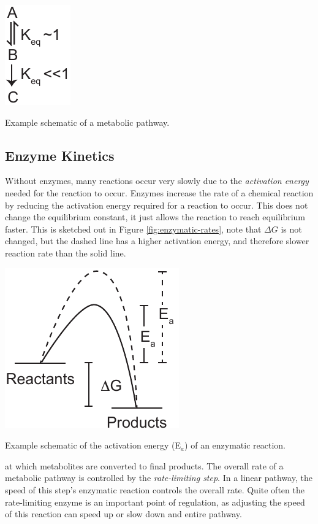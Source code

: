 \documentclass{tufte-handout}
\begin{document}
\begin{marginfigure}
\includegraphics[width=0.5\marginparwidth]{figures/committed-step.pdf}\
\caption{Example schematic of a metabolic pathway.}
\label{fig:committed-step}
\end{marginfigure}

\subsection{Enzyme Kinetics}

Without enzymes, many reactions occur very slowly due to the \emph{activation energy} needed for the reaction to occur.  Enzymes increase the rate of a chemical reaction by reducing the activation energy required for a reaction to occur.  This does not change the equilibrium constant, it just allows the reaction to reach equilibrium faster.  This is sketched out in Figure \ref{fig:enzymatic-rates}, note that $\Delta G$ is not changed, but the dashed line has a higher activation energy, and therefore slower reaction rate than the solid line.  

\begin{marginfigure}
\includegraphics[width=\marginparwidth]{figures/enzymatic-rates.pdf}\
\caption{Example schematic of the activation energy (E$_a$) of an enzymatic reaction.}
\label{fig:enzymatic-rates}
\end{marginfigure}

 at which metabolites are converted to final products. The overall rate of a metabolic pathway is controlled by the \emph{rate-limiting step}.  In a linear pathway, the speed of this step's enzymatic reaction controls the overall rate.  Quite often the rate-limiting enzyme is an important point of regulation, as adjusting the speed of this reaction can speed up or slow down and entire pathway.  
\end{document}
